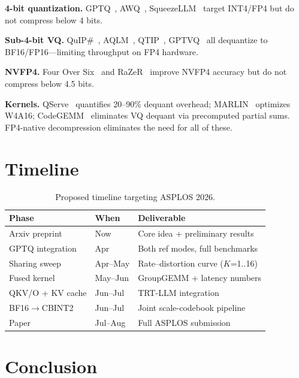 \documentclass[11pt,a4paper]{article}
\begin{document}
\textbf{4-bit quantization.}
GPTQ~\cite{frantar2023gptq}, AWQ~\cite{lin2024awq}, SqueezeLLM~\cite{kim2024squeezellm} target INT4/FP4 but do not compress below 4 bits.

\textbf{Sub-4-bit VQ.}
QuIP\#~\cite{tseng2024quipsharp}, AQLM~\cite{egiazarian2024aqlm}, QTIP~\cite{tseng2024qtip}, GPTVQ~\cite{vanbaalen2024gptvq} all dequantize to BF16/FP16---limiting throughput on FP4 hardware.

\textbf{NVFP4.}
Four Over Six~\cite{cook2025fouroversix} and RaZeR~\cite{chen2026razer} improve NVFP4 accuracy but do not compress below 4.5 bits.

\textbf{Kernels.}
QServe~\cite{lin2025qserve} quantifies 20--90\% dequant overhead; MARLIN~\cite{frantar2024marlin} optimizes W4A16; CodeGEMM~\cite{park2025codegemm} eliminates VQ dequant via precomputed partial sums.
FP4-native decompression eliminates the need for all of these.

\section{Timeline}

\begin{table}[h]
\centering
\caption{Proposed timeline targeting ASPLOS 2026.}
\label{tab:timeline}
\begin{tabular}{lll}
\toprule
\textbf{Phase} & \textbf{When} & \textbf{Deliverable} \\
\midrule
Arxiv preprint & Now & Core idea + preliminary results \\
GPTQ integration & Apr & Both ref modes, full benchmarks \\
Sharing sweep & Apr--May & Rate--distortion curve ($K$=1..16) \\
Fused kernel & May--Jun & GroupGEMM + latency numbers \\
QKV/O + KV cache & Jun--Jul & TRT-LLM integration \\
BF16$\to$CBINT2 & Jun--Jul & Joint scale-codebook pipeline \\
Paper & Jul--Aug & Full ASPLOS submission \\
\bottomrule
\end{tabular}
\end{table}

\section{Conclusion}
\end{document}

